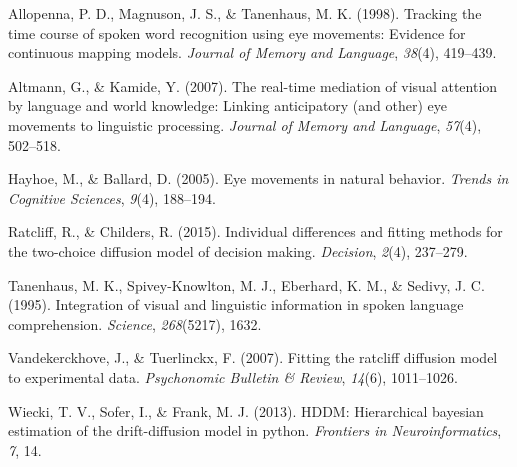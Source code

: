 \documentclass[10pt, letterpaper]{article}
\begin{document}
\setlength{\parindent}{-0.1in} \setlength{\leftskip}{0.125in} \noindent

\hypertarget{refs}{}
\hypertarget{ref-allopenna1998tracking}{}
Allopenna, P. D., Magnuson, J. S., \& Tanenhaus, M. K. (1998). Tracking
the time course of spoken word recognition using eye movements: Evidence
for continuous mapping models. \emph{Journal of Memory and Language},
\emph{38}(4), 419--439.

\hypertarget{ref-altmann2007real}{}
Altmann, G., \& Kamide, Y. (2007). The real-time mediation of visual
attention by language and world knowledge: Linking anticipatory (and
other) eye movements to linguistic processing. \emph{Journal of Memory
and Language}, \emph{57}(4), 502--518.

\hypertarget{ref-hayhoe2005eye}{}
Hayhoe, M., \& Ballard, D. (2005). Eye movements in natural behavior.
\emph{Trends in Cognitive Sciences}, \emph{9}(4), 188--194.

\hypertarget{ref-ratcliff2015individual}{}
Ratcliff, R., \& Childers, R. (2015). Individual differences and fitting
methods for the two-choice diffusion model of decision making.
\emph{Decision}, \emph{2}(4), 237--279.

\hypertarget{ref-tanenhaus1995integration}{}
Tanenhaus, M. K., Spivey-Knowlton, M. J., Eberhard, K. M., \& Sedivy, J.
C. (1995). Integration of visual and linguistic information in spoken
language comprehension. \emph{Science}, \emph{268}(5217), 1632.

\hypertarget{ref-vandekerckhove2007fitting}{}
Vandekerckhove, J., \& Tuerlinckx, F. (2007). Fitting the ratcliff
diffusion model to experimental data. \emph{Psychonomic Bulletin \&
Review}, \emph{14}(6), 1011--1026.

\hypertarget{ref-wiecki2013hddm}{}
Wiecki, T. V., Sofer, I., \& Frank, M. J. (2013). HDDM: Hierarchical
bayesian estimation of the drift-diffusion model in python.
\emph{Frontiers in Neuroinformatics}, \emph{7}, 14.
\end{document}
